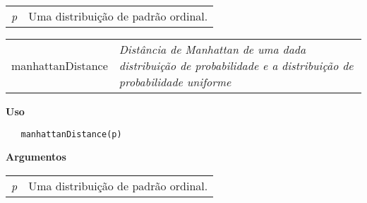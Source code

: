 \documentclass[12pt,letterpaper]{article}
\begin{document}
\begin{table}[!h]
\begin{center}
\begin{tabularx}{\textwidth}{X X}
\hspace{0.5cm} \textit{p} & Uma distribuição de padrão ordinal.\\
\end{tabularx}
\end{center}
\end{table} 

\newpage


\hrulefill   

\begin{table}[!h]
\begin{center}
\begin{tabularx}{\textwidth}{ X X}
\hspace{0.5cm} manhattanDistance & \textit{Distância de Manhattan de uma dada distribuição de probabilidade e a distribuição de probabilidade uniforme}\\
\end{tabularx}
\end{center}
\end{table} 

\vspace{-0.5cm}

\hrulefill  

\vspace{0.5cm}

\textbf{Uso}

\begin{lstlisting}
   manhattanDistance(p)
\end{lstlisting}

\vspace{0.5cm}

\textbf{Argumentos}

\begin{table}[!h]
\begin{center}
\begin{tabularx}{\textwidth}{X X}
\hspace{0.5cm} \textit{p} & Uma distribuição de padrão ordinal.\\
\end{tabularx}
\end{center}
\end{table} 
\end{document}
